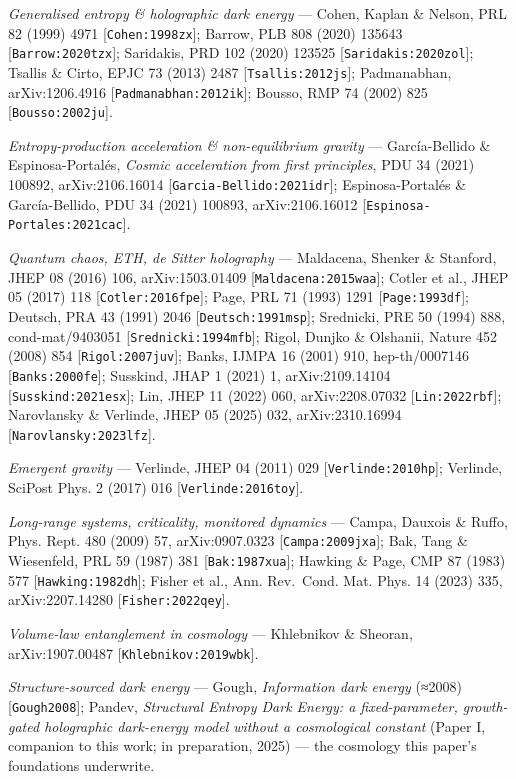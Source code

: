 \documentclass[
  10pt,
]{article}
\begin{document}
\emph{Generalised entropy \& holographic dark energy} --- Cohen, Kaplan
\& Nelson, PRL 82 (1999) 4971 {[}\texttt{Cohen:1998zx}{]}; Barrow, PLB
808 (2020) 135643 {[}\texttt{Barrow:2020tzx}{]}; Saridakis, PRD 102
(2020) 123525 {[}\texttt{Saridakis:2020zol}{]}; Tsallis \& Cirto, EPJC
73 (2013) 2487 {[}\texttt{Tsallis:2012js}{]}; Padmanabhan,
arXiv:1206.4916 {[}\texttt{Padmanabhan:2012ik}{]}; Bousso, RMP 74 (2002)
825 {[}\texttt{Bousso:2002ju}{]}.

\emph{Entropy-production acceleration \& non-equilibrium gravity} ---
García-Bellido \& Espinosa-Portalés, \emph{Cosmic acceleration from
first principles}, PDU 34 (2021) 100892, arXiv:2106.16014
{[}\texttt{Garcia-Bellido:2021idr}{]}; Espinosa-Portalés \&
García-Bellido, PDU 34 (2021) 100893, arXiv:2106.16012
{[}\texttt{Espinosa-Portales:2021cac}{]}.

\emph{Quantum chaos, ETH, de Sitter holography} --- Maldacena, Shenker
\& Stanford, JHEP 08 (2016) 106, arXiv:1503.01409
{[}\texttt{Maldacena:2015waa}{]}; Cotler et al., JHEP 05 (2017) 118
{[}\texttt{Cotler:2016fpe}{]}; Page, PRL 71 (1993) 1291
{[}\texttt{Page:1993df}{]}; Deutsch, PRA 43 (1991) 2046
{[}\texttt{Deutsch:1991msp}{]}; Srednicki, PRE 50 (1994) 888,
cond-mat/9403051 {[}\texttt{Srednicki:1994mfb}{]}; Rigol, Dunjko \&
Olshanii, Nature 452 (2008) 854 {[}\texttt{Rigol:2007juv}{]}; Banks,
IJMPA 16 (2001) 910, hep-th/0007146 {[}\texttt{Banks:2000fe}{]};
Susskind, JHAP 1 (2021) 1, arXiv:2109.14104
{[}\texttt{Susskind:2021esx}{]}; Lin, JHEP 11 (2022) 060,
arXiv:2208.07032 {[}\texttt{Lin:2022rbf}{]}; Narovlansky \& Verlinde,
JHEP 05 (2025) 032, arXiv:2310.16994 {[}\texttt{Narovlansky:2023lfz}{]}.

\emph{Emergent gravity} --- Verlinde, JHEP 04 (2011) 029
{[}\texttt{Verlinde:2010hp}{]}; Verlinde, SciPost Phys. 2 (2017) 016
{[}\texttt{Verlinde:2016toy}{]}.

\emph{Long-range systems, criticality, monitored dynamics} --- Campa,
Dauxois \& Ruffo, Phys. Rept. 480 (2009) 57, arXiv:0907.0323
{[}\texttt{Campa:2009jxa}{]}; Bak, Tang \& Wiesenfeld, PRL 59 (1987) 381
{[}\texttt{Bak:1987xua}{]}; Hawking \& Page, CMP 87 (1983) 577
{[}\texttt{Hawking:1982dh}{]}; Fisher et al., Ann. Rev.~Cond. Mat. Phys.
14 (2023) 335, arXiv:2207.14280 {[}\texttt{Fisher:2022qey}{]}.

\emph{Volume-law entanglement in cosmology} --- Khlebnikov \& Sheoran,
arXiv:1907.00487 {[}\texttt{Khlebnikov:2019wbk}{]}.

\emph{Structure-sourced dark energy} --- Gough, \emph{Information dark
energy} (≈2008) {[}\texttt{Gough2008}{]}; Pandev, \emph{Structural
Entropy Dark Energy: a fixed-parameter, growth-gated holographic
dark-energy model without a cosmological constant} (Paper I, companion
to this work; in preparation, 2025) --- the cosmology this paper's
foundations underwrite.
\end{document}
